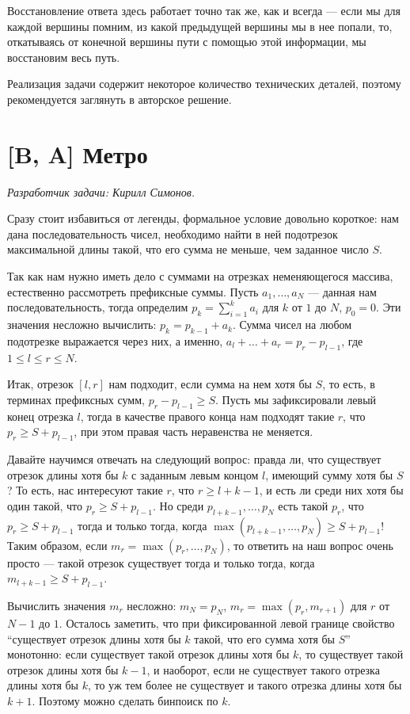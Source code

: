 \documentclass[12pt]{article}
\theoremstyle{definition}
\begin{document}
Восстановление ответа здесь работает точно так же, как и всегда --- если мы для каждой вершины помним, из какой предыдущей вершины мы в нее попали, то, откатываясь от конечной
вершины пути с помощью этой информации, мы восстановим весь путь.

Реализация задачи содержит некоторое количество технических деталей, поэтому рекомендуется
заглянуть в авторское решение.

\section{[B, A] Метро}
\textit{Разработчик задачи: Кирилл Симонов.}

Сразу стоит избавиться от легенды, формальное условие довольно короткое:
нам дана последовательность чисел, необходимо найти
в ней подотрезок максимальной длины такой, что его сумма не меньше, чем заданное число $S$.

Так как нам нужно иметь дело с суммами на отрезках неменяющегося массива,
естественно рассмотреть префиксные суммы. Пусть $a_1,\dots,a_N$ --- данная нам
последовательность, тогда определим $p_k = \sum_{i = 1}^k a_i$ для $k$ от $1$ до $N$,
$p_0 = 0$. Эти значения несложно вычислить: $p_k = p_{k - 1} + a_k$. Сумма чисел на
любом подотрезке выражается через них, а именно, $a_l + \dots + a_r = p_r - p_{l - 1}$,
где $1 \le l \le r \le N$.

Итак, отрезок $[l, r]$ нам подходит, если сумма на нем хотя бы $S$, то есть,
в терминах префиксных сумм, $p_r - p_{l - 1} \ge S$. Пусть мы зафиксировали
левый конец отрезка $l$, тогда в качестве правого конца нам подходят такие $r$,
что $p_r \ge S + p_{l - 1}$, при этом правая часть неравенства не меняется.

Давайте научимся отвечать на следующий вопрос: правда ли, что существует отрезок длины
хотя бы $k$ с заданным левым концом $l$, имеющий сумму хотя бы $S$? То есть, нас
интересуют такие $r$, что $r \ge l + k - 1$, и есть ли среди них хотя бы один такой, что
$p_r \ge S + p_{l - 1}$. Но среди $p_{l + k - 1},\dots, p_N$ есть такой $p_r$, что
$p_r \ge S + p_{l - 1}$ тогда и только тогда, когда
$\max(p_{l + k - 1}, \dots, p_N) \ge S + p_{l - 1}$! Таким образом,
если $m_r = \max(p_r, \dots, p_N)$, то ответить на наш вопрос очень просто ---
такой отрезок существует тогда и только тогда, когда $m_{l + k - 1} \ge S + p_{l - 1}$.

Вычислить значения $m_r$ несложно: $m_N = p_N$, $m_r = \max(p_r, m_{r + 1})$ для $r$ от
$N - 1$ до $1$. Осталось заметить, что при фиксированной левой границе свойство
``существует отрезок длины хотя бы $k$ такой, что его сумма хотя бы $S$'' монотонно:
если существует такой отрезок длины хотя бы $k$, то существует такой отрезок длины
хотя бы $k - 1$, и наоборот, если не существует такого отрезка длины хотя бы $k$, то уж
тем более не существует и такого отрезка длины хотя бы $k + 1$. Поэтому можно сделать
бинпоиск по $k$.
\end{document}
